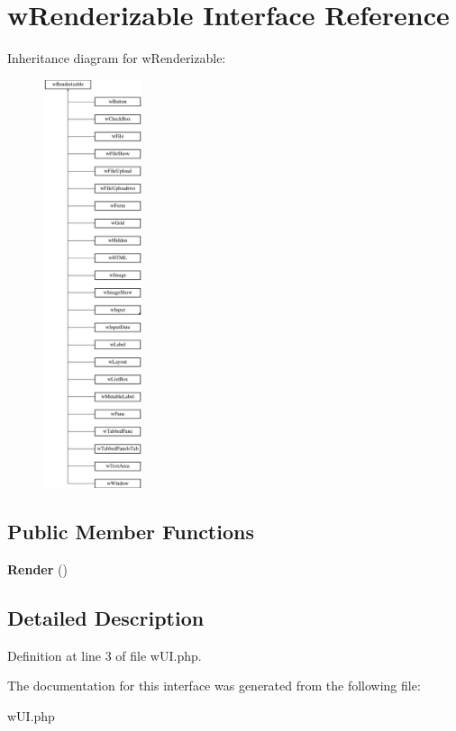 \hypertarget{interfacewRenderizable}{
\section{wRenderizable Interface Reference}
\label{interfacewRenderizable}
}
Inheritance diagram for wRenderizable:\begin{figure}[H]
\begin{center}
\leavevmode
\includegraphics[height=12.000000cm]{interfacewRenderizable}
\end{center}
\end{figure}
\subsection*{Public Member Functions}
\begin{DoxyCompactItemize}
\item 
\hypertarget{interfacewRenderizable_a53efe86d5a3106fbd10a90e3ccac4335}{
{\bfseries Render} ()}
\label{interfacewRenderizable_a53efe86d5a3106fbd10a90e3ccac4335}

\end{DoxyCompactItemize}


\subsection{Detailed Description}


Definition at line 3 of file wUI.php.



The documentation for this interface was generated from the following file:\begin{DoxyCompactItemize}
\item 
wUI.php\end{DoxyCompactItemize}
